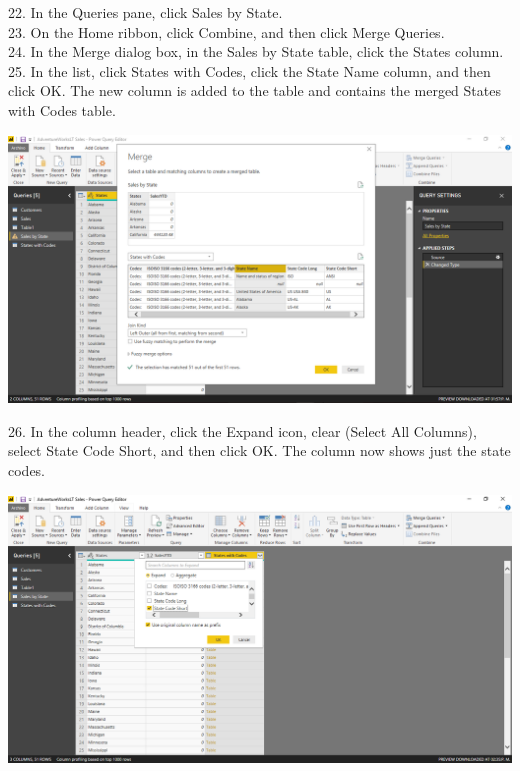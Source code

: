 22. In the Queries pane, click Sales by State.\\
23. On the Home ribbon, click Combine, and then click Merge Queries.\\
24. In the Merge dialog box, in the Sales by State table, click the States column.\\
25. In the list, click States with Codes, click the State Name column, and then click OK. The new column
is added to the table and contains the merged States with Codes table.\\

	\begin{center}
	\includegraphics[width=17cm]{./Imagenes/Ejercicio1/Tarea4/16}
	\end{center}	

26. In the column header, click the Expand icon, clear (Select All Columns), select State Code Short,
and then click OK. The column now shows just the state codes.\\

	\begin{center}
	\includegraphics[width=17cm]{./Imagenes/Ejercicio1/Tarea4/17}
	\end{center}	

